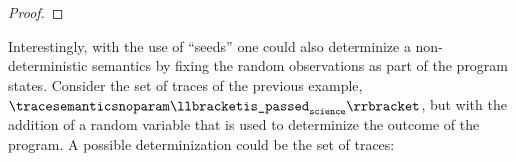\begin{proof}
\end{proof}

\begin{example}
  Interestingly, with the use of ``seeds'' one could also determinize a non-deterministic semantics by fixing the random observations as part of the program states.
  Consider the set of traces of the previous example, \cf{} $\tracesemanticsnoparam\semanticsof{\texttt{is\_passed}_\texttt{science}}$, but with the addition of a random variable that is used to determinize the outcome of the program.
  A possible determinization could be the set of traces:
  \begin{marginfigure}[*5]
\end{marginfigure}
\end{example}
